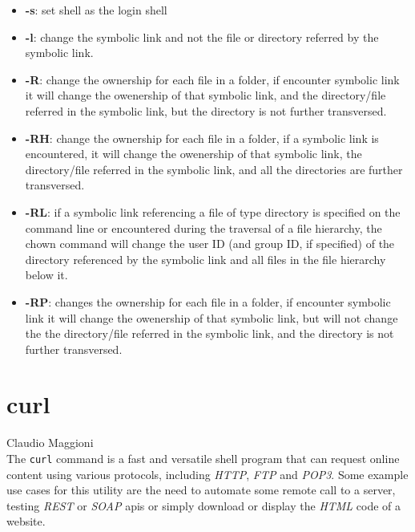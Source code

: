 \documentclass[hidelinks,12pt,a4paper,numbers=enddot]{scrartcl}
\begin{document}
\begin{itemize}
    \item \textbf{-s}: set shell as the login shell
    \item \textbf{-l}: change the symbolic link and not the file or directory referred
        by the symbolic link.
    
    \item \textbf{-R}: change the ownership for each file in a folder, if encounter symbolic link
        it will change the owenership of that symbolic link,
        and the directory/file referred in the symbolic link, but the directory
        is not further transversed.
    
    \item \textbf{-RH}: change the ownership for each file in a folder, if a symbolic link is
        encountered, it will change the owenership of that symbolic link,
        the directory/file referred in the symbolic link, and all the
        directories are further transversed.
    
    \item \textbf{-RL}: if a symbolic link referencing a file of type directory
        is specified on the command line or encountered during the traversal of a file hierarchy,
        the chown command will change the user ID (and group ID, if specified) of the directory
        referenced by the symbolic link and all files in the file hierarchy below it.
    
    \item \textbf{-RP}: changes the ownership for each file in a folder, if encounter symbolic link it
        will change the owenership of that symbolic link, but will not change the
        the directory/file referred in the symbolic link, and
        the directory is not further transversed.
    
\end{itemize}

\section{curl}


\large Claudio Maggioni \normalsize\\


The \texttt{curl} command is a fast and versatile shell program that can
request online content using various protocols, including \emph{HTTP},
\emph{FTP} and \emph{POP3}. Some example use cases for this utility are
the need to automate some remote call to a server, testing \emph{REST} or
\emph{SOAP} apis or simply download or display the \emph{HTML} code of a
website.
\end{document}
